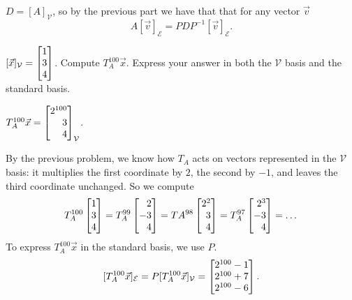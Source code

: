 \begin{parts}
\begin{solution}
				$D=[A]_{\mathcal V}$, so by the previous part we have that
				that for any vector $\vec v$
				\[
					A[\vec v]_{\mathcal E}=PDP^{-1}[\vec v]_{\mathcal E}.
				\]
			\end{solution}
		\item $[\vec x]_{\mathcal V}=\mat{1\\3\\4}$.  Compute $T_A^{100}\vec x$. Express
			your answer in both the $\mathcal V$ basis and the standard basis.
			\begin{solution}
				$T_A^{100}\vec x=\mat{2^{100}\\3\\4}_{\mathcal V}$.

				By the previous problem, we know how $T_A$ acts on vectors represented
				in the $\mathcal V$ basis: it multiplies the first coordinate by
				$2$, the second by $-1$, and leaves the third coordinate unchanged.
				So we compute
				\[
					T_A^{100}\mat{1\\3\\4}
					=T_A^{99}\mat{2\\-3\\4}
					=TA^{98}\mat{2^2\\3\\4}
					=T_A^{97}\mat{2^3\\-3\\4}
					=\dots
				\]
				To express $T_A^{100}\vec x$ in the standard basis, we use $P$.
				\[
					[T_A^{100}\vec x]_{\mathcal E} = P[T_A^{100}\vec x]_{\mathcal V} = \mat{2^{100}-1\\2^{100}+7\\2^{100}-6}.
				\]
			\end{solution}
	\end{parts}


